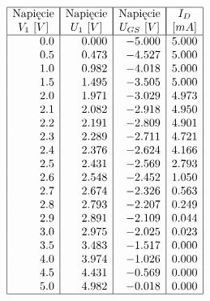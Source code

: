 \documentclass[polish,polish,a4paper]{article}
\begin{document}
	\begin{figure}[H]
	\begin{spacing}{1.3}
		\begin{equation*}
		\begin{array}{|r|r|r|r|}
		\hline
		\multicolumn{1}{|c|}{ $Napięcie$}&\multicolumn{1}{|c|}{ $Napięcie$}&\multicolumn{1}{|c|}{ $Napięcie$}&\multicolumn{1}{|c|}{I_{D}}\\
		\multicolumn{1}{|c|}{  V_{1}$ $[V]}&\multicolumn{1}{|c|}{ U_{1}$ $[V]}&\multicolumn{1}{|c|}{ U_{GS}$ $[V]}&\multicolumn{1}{|c|}{[mA]}\\\hline
0.0&0.000&-5.000&5.000\\
0.5&0.473&-4.527&5.000\\
1.0&0.982&-4.018&5.000\\
1.5&1.495&-3.505&5.000\\
2.0&1.971&-3.029&4.973\\
2.1&2.082&-2.918&4.950\\
2.2&2.191&-2.809&4.901\\
2.3&2.289&-2.711&4.721\\
2.4&2.376&-2.624&4.166\\
2.5&2.431&-2.569&2.793\\
2.6&2.548&-2.452&1.050\\
2.7&2.674&-2.326&0.563\\
2.8&2.793&-2.207&0.249\\
2.9&2.891&-2.109&0.044\\
3.0&2.975&-2.025&0.023\\
3.5&3.483&-1.517&0.000\\
4.0&3.974&-1.026&0.000\\
4.5&4.431&-0.569&0.000\\
5.0&4.982&-0.018&0.000\\
\hline
		\end{array}
		\end{equation*}
	\end{spacing}
\end{figure}
\end{document}
